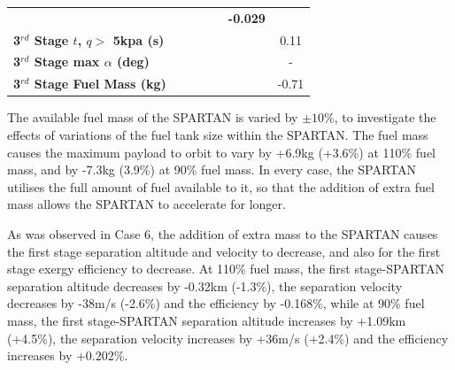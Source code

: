 \begin{table}
\begin{tabular}{l c c c c c c}
	& \textbf{\thirddExergyEffmFuelNinetyFiveNoReturn}
	& \textbf{\thirddExergyEffmFuelStandardNoReturn}
	& \textbf{\thirddExergyEffmFuelOneHundredFiveNoReturn}
	& \textbf{\thirddExergyEffmFuelOneHundredTenNoReturn}
	& \textbf{-0.029}
	\\
	\textbf{3$^{rd}$ Stage $t$, $q >$ 5kpa (s)}
	& \thirdqOverFivemFuelNinetyNoReturn
	& \thirdqOverFivemFuelNinetyFiveNoReturn
	& \thirdqOverFivemFuelStandardNoReturn
	& \thirdqOverFivemFuelOneHundredFiveNoReturn
	& \thirdqOverFivemFuelOneHundredTenNoReturn
	&0.11
	\\
	\textbf{3$^{rd}$ Stage max $\alpha$ (deg)}
	& \thirdmaxAoAmFuelNinetyNoReturn
	& \thirdmaxAoAmFuelNinetyFiveNoReturn
	& \thirdmaxAoAmFuelStandardNoReturn
	& \thirdmaxAoAmFuelOneHundredFiveNoReturn
	& \thirdmaxAoAmFuelOneHundredTenNoReturn
	& -
	\\
	\textbf{3$^{rd}$ Stage Fuel Mass (kg)}
	& \thirdmFuelmFuelNinetyNoReturn
	& \thirdmFuelmFuelNinetyFiveNoReturn
	& \thirdmFuelmFuelStandardNoReturn
	& \thirdmFuelmFuelOneHundredFiveNoReturn
	& \thirdmFuelmFuelOneHundredTenNoReturn
	&-0.71
	\\
	\hline 
\end{tabular} 
\end{table}

The available fuel mass of the SPARTAN is varied by $\pm 10\%$, to investigate the effects of variations of the fuel tank size within the SPARTAN.
The fuel mass causes the maximum payload to orbit to vary by +6.9kg (+3.6\%) at 110\% fuel mass, and by -7.3kg (3.9\%) at 90\% fuel mass. 
 In every case, the SPARTAN utilises the full amount of fuel available to it, so that the addition of extra fuel mass allows the SPARTAN to accelerate for longer. 
 
 As was observed in Case 6, the addition of extra mass to the SPARTAN causes the first stage separation altitude and velocity to decrease, and also for the first stage exergy efficiency to decrease. At 110\% fuel mass, the first stage-SPARTAN separation altitude decreases by -0.32km (-1.3\%), the separation velocity decreases by -38m/s (-2.6\%) and the efficiency by -0.168\%, while at 90\% fuel mass, the first stage-SPARTAN separation altitude increases by +1.09km (+4.5\%), the separation velocity increases by +36m/s (+2.4\%) and the efficiency increases by +0.202\%.
 
